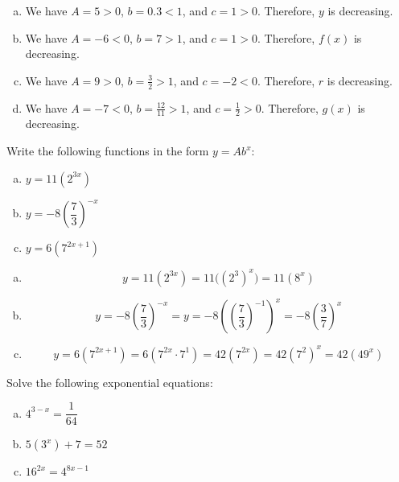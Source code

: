 \documentclass[11pt,letterpaper]{article}
\begin{document}
\sol
\begin{enumerate}[(a)]
\item We have $A= 5 > 0$, $b= 0.3 < 1$, and $c= 1 > 0$. Therefore, $y$ is decreasing. 

\item We have $A= -6 < 0$, $b= 7 > 1$, and $c= 1 > 0$. Therefore, $f(x)$ is decreasing. 

\item We have $A= 9 > 0$, $b= \frac{3}{2} > 1$, and $c= -2 < 0$. Therefore, $r$ is decreasing.

\item We have $A= -7 < 0$, $b= \frac{12}{11} > 1$, and $c= \frac{1}{2} > 0$. Therefore, $g(x)$ is decreasing. 
\end{enumerate}



\newpage



 Write the following functions in the form $y= Ab^x$:
	\begin{enumerate}[(a)]
	\item $y= 11(2^{3x})$
	\item $y= -8 \left( \dfrac{7}{3} \right)^{-x}$
	\item $y= 6 (7^{2x + 1})$
	\end{enumerate} \pspace

\sol
\begin{enumerate}[(a)]
\item 
	\[
	y= 11(2^{3x})= 11 \big( (2^3)^x \big)= 11 (8^x)
	\] \pspace

\item 
	\[
	y= -8 \left( \dfrac{7}{3} \right)^{-x}= y= -8 \left( \left( \dfrac{7}{3} \right)^{-1} \right)^x= -8 \left( \dfrac{3}{7} \right)^x
	\] \pspace

\item 
	\[
	y= 6(7^{2x + 1})= 6(7^{2x} \cdot 7^1)= 42(7^{2x})= 42 (7^2)^x= 42(49^x)
	\]
\end{enumerate}



\newpage



 Solve the following exponential equations:
	\begin{enumerate}[(a)]
	\item $4^{3-x}= \dfrac{1}{64}$
	\item $5(3^x) + 7= 52$
	\item $16^{2x}= 4^{8x - 1}$
	\end{enumerate} \pspace
\end{document}
